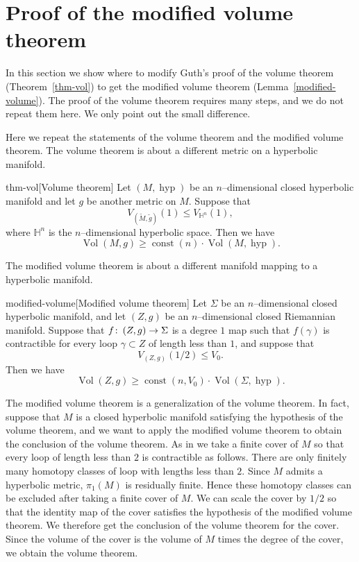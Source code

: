 \documentclass[12pt]{amsart}
\numberwithin{equation}{section}
\begin{document}
\section{Proof of the modified volume theorem}\label{sect:proof}

In this section we show where to modify Guth's proof of the volume theorem (Theorem~\ref{thm-vol}) to get the modified volume theorem (Lemma~\ref{modified-volume}).  The proof of the volume theorem requires many steps, and we do not repeat them here.  We only point out the small difference.

Here we repeat the statements of the volume theorem and the modified volume theorem.  The volume theorem is about a different metric on a hyperbolic manifold.

\begin{repthm}{thm-vol}[Volume theorem]
 Let $(M, \operatorname{hyp})$ be an $n$--dimensional closed hyperbolic manifold and let $g$ be another metric on $M$. Suppose that
\[V_{(\widetilde{M}, \widetilde{g})}(1) \leq V_{\mathbb{H}^n}(1),\]
where $\mathbb{H}^n$ is the $n$--dimensional hyperbolic
 space.  Then we have
\[\operatorname{Vol}(M, g) \geq \operatorname{const}(n) \cdot \operatorname{Vol}(M, \operatorname{hyp}).\]
\end{repthm}

The modified volume theorem is about a different manifold mapping to a hyperbolic manifold.

 \begin{replem}{modified-volume}[Modified volume theorem]
 Let $\Sigma$ be an $n$--dimensional closed hyperbolic manifold, and let $(Z, g)$ be an $n$--dimensional closed Riemannian manifold.  Suppose that $f {\colon\thinspace} (Z, g) \rightarrow \Sigma$ is a degree $1$ map such that $f(\gamma)$ is contractible for every loop $\gamma \subset Z$ of length less than $1$, and suppose that
\[V_{(Z, g)}(1/2) \leq V_0.\]
Then we have
\[\operatorname{Vol} (Z, g) \geq \operatorname{const}(n, V_0) \cdot \operatorname{Vol}(\Sigma, \operatorname{hyp}).\]
\end{replem}

The modified volume theorem is a generalization of the volume theorem. In fact, suppose that $M$ is a closed hyperbolic manifold
satisfying the hypothesis of the volume theorem, and we want to apply the modified volume theorem to obtain the conclusion of the volume theorem. As in
\cite[page 71]{Guth11} we take a finite cover of $M$ so that every loop
of length less than $2$ is contractible as follows. There
are only finitely many homotopy classes of loop with lengths less than
$2$. Since $M$ admits a hyperbolic metric, $\pi_1(M)$ is
residually finite. Hence these homotopy classes can be excluded after
taking a finite cover of $M$. We can scale the cover by $1/2$ so that the identity map of the cover
satisfies the hypothesis of the modified volume theorem.  We therefore get the
conclusion of the volume theorem for the cover. Since the volume
of the cover is the volume of $M$ times the degree of the cover, we
obtain the volume theorem.
\end{document}
